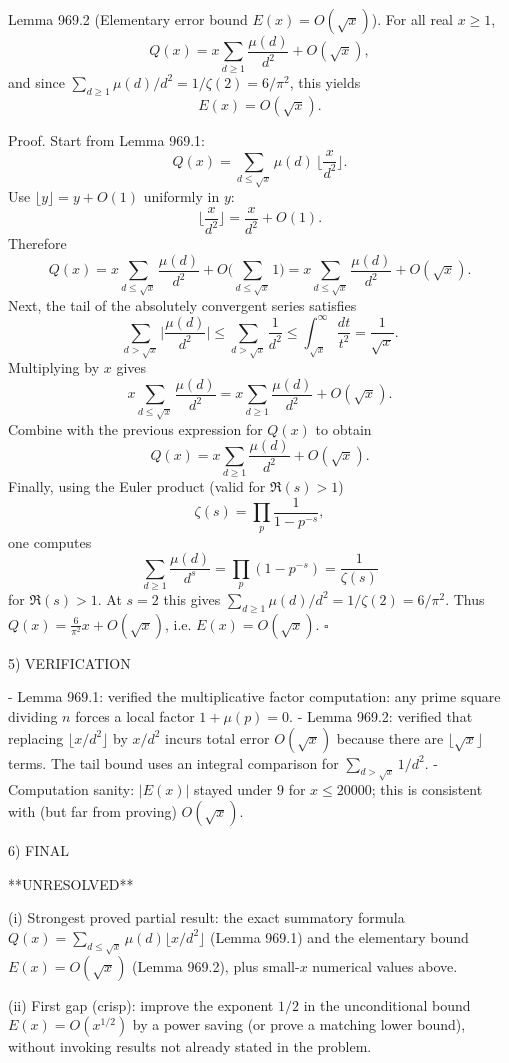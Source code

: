 Lemma 969.2 (Elementary error bound $E(x)=O(\sqrt x)$).
For all real $x\ge 1$,
\[
Q(x)=x\sum_{d\ge 1}\frac{\mu(d)}{d^2} + O(\sqrt x),
\]
and since $\sum_{d\ge 1}\mu(d)/d^2 = 1/\zeta(2)=6/\pi^2$, this yields
\[
E(x)=O(\sqrt x).
\]

Proof.
Start from Lemma 969.1:
\[
Q(x)=\sum_{d\le \sqrt x} \mu(d)\,\Big\lfloor\frac{x}{d^2}\Big\rfloor.
\]
Use $\lfloor y\rfloor = y + O(1)$ uniformly in $y$:
\[
\Big\lfloor\frac{x}{d^2}\Big\rfloor = \frac{x}{d^2} + O(1).
\]
Therefore
\[
Q(x)= x\sum_{d\le \sqrt x}\frac{\mu(d)}{d^2} + O\Big(\sum_{d\le \sqrt x} 1\Big)
= x\sum_{d\le \sqrt x}\frac{\mu(d)}{d^2} + O(\sqrt x).
\]
Next, the tail of the absolutely convergent series satisfies
\[
\sum_{d>\sqrt x}\Big|\frac{\mu(d)}{d^2}\Big| \le \sum_{d>\sqrt x} \frac{1}{d^2} \le \int_{\sqrt x}^{\infty} \frac{dt}{t^2} = \frac{1}{\sqrt x}.
\]
Multiplying by $x$ gives
\[
 x\sum_{d\le \sqrt x}\frac{\mu(d)}{d^2} = x\sum_{d\ge 1}\frac{\mu(d)}{d^2} + O(\sqrt x).
\]
Combine with the previous expression for $Q(x)$ to obtain
\[
Q(x)=x\sum_{d\ge 1}\frac{\mu(d)}{d^2} + O(\sqrt x).
\]
Finally, using the Euler product (valid for $\Re(s)>1$)
\[
\zeta(s)=\prod_p \frac{1}{1-p^{-s}},
\]
one computes
\[
\sum_{d\ge 1}\frac{\mu(d)}{d^s} = \prod_p (1-p^{-s}) = \frac{1}{\zeta(s)}
\]
for $\Re(s)>1$.
At $s=2$ this gives $\sum_{d\ge 1} \mu(d)/d^2 = 1/\zeta(2)=6/\pi^2$.
Thus $Q(x)=\frac{6}{\pi^2}x+O(\sqrt x)$, i.e. $E(x)=O(\sqrt x)$. $\square$

5) VERIFICATION

- Lemma 969.1: verified the multiplicative factor computation: any prime square dividing $n$ forces a local factor $1+\mu(p)=0$.
- Lemma 969.2: verified that replacing $\lfloor x/d^2\rfloor$ by $x/d^2$ incurs total error $O(\sqrt x)$ because there are $\lfloor\sqrt x\rfloor$ terms.
  The tail bound uses an integral comparison for $\sum_{d>\sqrt x}1/d^2$.
- Computation sanity: $|E(x)|$ stayed under $9$ for $x\le 20000$; this is consistent with (but far from proving) $O(\sqrt x)$.

6) FINAL

**UNRESOLVED**

(i) Strongest proved partial result: the exact summatory formula $Q(x)=\sum_{d\le\sqrt x}\mu(d)\lfloor x/d^2\rfloor$ (Lemma 969.1) and the elementary bound $E(x)=O(\sqrt x)$ (Lemma 969.2), plus small-$x$ numerical values above.

(ii) First gap (crisp): improve the exponent $1/2$ in the unconditional bound $E(x)=O(x^{1/2})$ by a power saving (or prove a matching lower bound), without invoking results not already stated in the problem.

